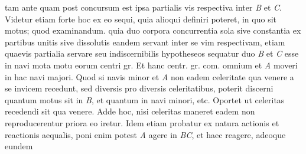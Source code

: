 tam ante quam post concursum est ipsa partialis vis respectiva inter \textit{B} et \textit{C}. 
Videtur etiam forte hoc ex eo sequi, quia alioqui definiri poteret, in quo sit motus; quod examinandum.
quia duo corpora concurrentia sola sive constantia ex partibus unitis sive dissolutis eandem servant inter se vim respectivam, etiam
quaevis partialia servare
\pend
\pstart
{}
seu indiscernibilis hypotheseos sequatur
duo \textit{B} et \textit{C} esse in navi mota motu eorum centri gr. 
Et hanc 
centr. gr. com. omnium et \textit{A} moveri in hac navi majori. 
Quod si navis minor et \textit{A} non eadem celeritate qua venere a se invicem recedunt, 
sed diversis pro diversis celeritatibus, poterit discerni quantum motus sit in \textit{B}, 
et quantum in navi minori, etc.
Oportet ut celeritas recedendi sit qua venere. \pend
\pstart 
Adde hoc, nisi celeritas maneret eadem non reproducerentur priora
eo iretur. 
\pend
\pstart 
Idem etiam probatur ex natura actionis et reactionis aequalis, poni enim potest \textit{A} agere in \textit{BC}, 
et haec reagere, adeoque eundem
